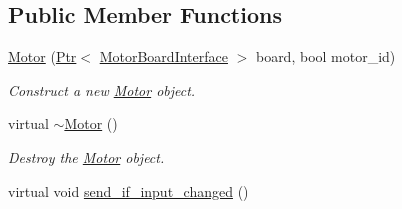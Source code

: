 \subsection*{Public Member Functions}
\begin{DoxyCompactItemize}
\item 
\hyperlink{classblmc__drivers_1_1Motor_a923be3c8e5027cdead1006f3878b6ec3}{Motor} (\hyperlink{classblmc__drivers_1_1MotorInterface_ae31f230b9da3674a05543023c90b124c}{Ptr}$<$ \hyperlink{classblmc__drivers_1_1MotorBoardInterface}{Motor\+Board\+Interface} $>$ board, bool motor\+\_\+id)
\begin{DoxyCompactList}\small\item\em Construct a new \hyperlink{classblmc__drivers_1_1Motor}{Motor} object. \end{DoxyCompactList}\item 
virtual \hyperlink{classblmc__drivers_1_1Motor_ad93b64d54b40ff12df7081e009c71239}{$\sim$\+Motor} ()
\begin{DoxyCompactList}\small\item\em Destroy the \hyperlink{classblmc__drivers_1_1Motor}{Motor} object. \end{DoxyCompactList}\item 
virtual void \hyperlink{classblmc__drivers_1_1Motor_acf7389e09918c1955986a641efd4f032}{send\+\_\+if\+\_\+input\+\_\+changed} ()\hypertarget{classblmc__drivers_1_1Motor_acf7389e09918c1955986a641efd4f032}{}\label{classblmc__drivers_1_1Motor_acf7389e09918c1955986a641efd4f032}


\end{DoxyCompactItemize}
